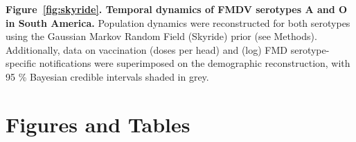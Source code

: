 \documentclass[10pt]{article}
\begin{document}
{\bf Figure~\ref{fig:skyride}. Temporal dynamics of FMDV serotypes A and O in South America.} Population dynamics were reconstructed for both serotypes using the Gaussian Markov Random Field (Skyride) prior (see Methods).
Additionally, data on vaccination  (doses per head) and (log) FMD serotype-specific notifications were superimposed on the demographic reconstruction, with 95 \% Bayesian credible intervals shaded in grey.

\newpage
\section{Figures and Tables}
\begin{figure}[H]
\begin{center}
\\

\end{center}
\end{figure}
\end{document}
